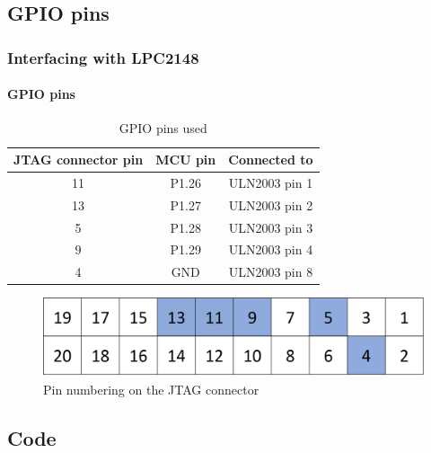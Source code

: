 \documentclass[table,10pt,red]{beamer}	%
\begin{document}
\subsection{GPIO pins}
\begin{frame}
	\frametitle{Interfacing with LPC2148}
	\framesubtitle{GPIO pins}
	\pause
	\begin{center}
		\begin{table}
			\begin{tabular}{c c c}
			\toprule
			\textbf{JTAG connector pin} & \textbf{MCU pin} & \textbf{Connected to}\\
			\midrule
			11 & P1.26 & ULN2003 pin 1 \\
			13 & P1.27 & ULN2003 pin 2 \\
			5 & P1.28 & ULN2003 pin 3 \\
			9 & P1.29 & ULN2003 pin 4 \\
			4 & GND & ULN2003 pin 8 \\
			\bottomrule
			\end{tabular}
			\caption{GPIO pins used}
		\end{table}
		
		\pause
		\begin{figure}
			\includegraphics[width=0.5\linewidth]{pinnumbering}
			\caption{Pin numbering on the JTAG connector}
		\end{figure}
	\end{center}
\end{frame}


\subsection{Code}
\end{document}
